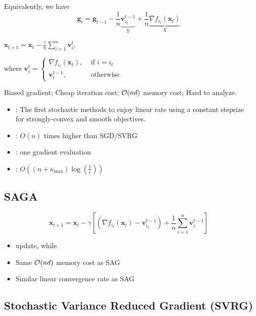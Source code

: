 Equivalently, we have
$$
\mathbf{g}_{t}=\mathbf{g}_{t-1}-\frac{1}{n} \underbrace{\mathbf{v}_{i_{t}}^{t-1}}_{Y} + \frac{1}{n} \underbrace{\nabla f_{i_{t}}\left(\mathbf{x}_{t}\right)}_{X}
$$

$\mathbf{x}_{t+1}=\mathbf{x}_{t}-\frac{\gamma}{n} \sum_{i=1}^{n} \mathbf{v}_{i}^{t}$,

where $\mathbf{v}_{i}^{t}= \begin{cases}\nabla f_{i_{t}}\left(\mathbf{x}_{t}\right), & \text { if } i=i_{t} \\ \mathbf{v}_{i}^{t-1}, & \text { otherwise }\end{cases}$

Biased gradient; Cheap iteration cost; $\operatorname{\mathcal{O}}(nd)$ memory cost; Hard to analyze.

\begin{itemize}[leftmargin=*]
    \item {}: The first stochastic methods to enjoy linear rate using a constant stepsize for strongly-convex and smooth objectives.
    \item {}: $O(n)$ times higher than SGD/SVRG 
    \item {}: one gradient evaluation 
    \item {}: $O\left(\left(n+\kappa_{\max }\right) \log \left(\frac{1}{\epsilon}\right)\right)$
\end{itemize}





\subsection*{SAGA}
$$
\mathbf{x}_{t+1}=\mathbf{x}_{t}-\gamma\left[\left(\nabla f_{i_{t}}\left(\mathbf{x}_{t}\right)-\mathbf{v}_{i_{t}}^{t-1}\right)+\frac{1}{n} \sum_{i=1}^{n} \mathbf{v}_{i}^{t-1}\right]
$$
\begin{itemize}[leftmargin=*]
    \item {} update, while 
    \item Same $\operatorname{\mathcal{O}}(n d)$ memory cost as SAG
    \item Similar linear convergence rate as SAG
\end{itemize}








\subsection*{Stochastic Variance Reduced Gradient (SVRG)}

